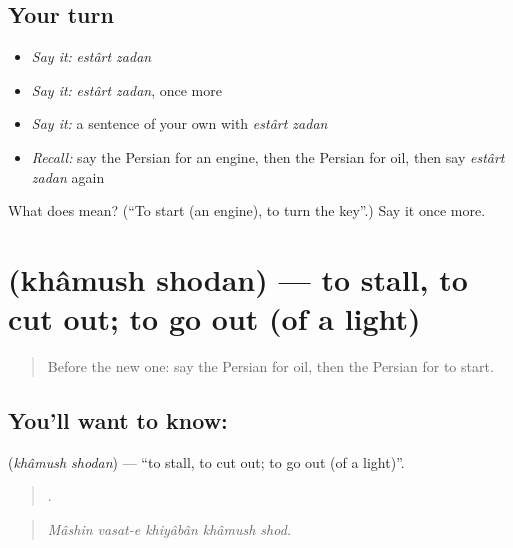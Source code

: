 \subsection*{Your turn}
\begin{itemize}
\raggedright
  \item \emph{Say it:} \emph{estârt zadan}
  \item \emph{Say it:} \emph{estârt zadan}, once more
  \item \emph{Say it:} a sentence of your own with \emph{estârt zadan}
  \item \emph{Recall:} say the Persian for an engine, then the Persian for oil, then say \emph{estârt zadan} again
\end{itemize}

\begin{tcolorbox}[breakable,colback=teal!4,colframe=teal!35!black,title={Before you move on}]
What does   mean? (\textquotedblleft{}To start (an engine), to turn the key\textquotedblright{}.) Say it once more.
\end{tcolorbox}
\section[\texorpdfstring{\fa{خاموش} \fa{شدن} (khâmush shodan)}{خاموش شدن (khâmush shodan)}]{  (khâmush shodan) — to stall, to cut out; to go out (of a light)}

\label{lesson:FA-C422-khamush-shodan}



\begin{quote}
Before the new one: say the Persian for oil, then the Persian for to start.
\end{quote}

\subsection*{You'll want to know:  }
\textbf{ } (\emph{khâmush shodan}) — \textquotedblleft{}to stall, to cut out; to go out (of a light)\textquotedblright{}.

\begin{quote}
    .
\end{quote}

\begin{quote}
\emph{Mâshin vasat-e khiyâbân khâmush shod.}
\end{quote}

